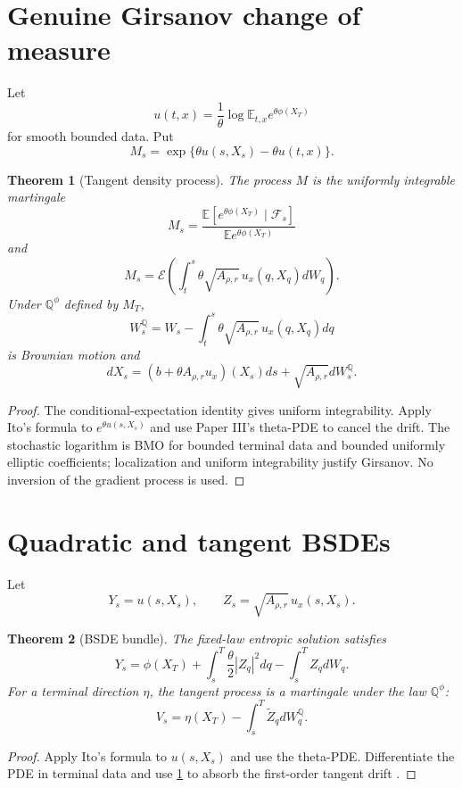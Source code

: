 \documentclass[11pt,reqno]{amsart}
\newtheorem{theorem}{Theorem}[section]
\theoremstyle{definition}
\theoremstyle{remark}
\newcommand{\E}{\mathbb E}
\newcommand{\Qp}{\mathbb Q}
\newcommand{\abs}[1]{\left\lvert #1\right\rvert}
\begin{document}
\section{Genuine Girsanov change of measure}\label{sec:girsanov}
Let
\[
 u(t,x)=\frac1\theta\log\E_{t,x}e^{\theta\phi(X_T)}
\]
for smooth bounded data.  Put
\[
 M_s=\exp\{\theta u(s,X_s)-\theta u(t,x)\}.
\]

\begin{theorem}[Tangent density process]\label{thm:girsanov}
The process $M$ is the uniformly integrable martingale
\[
 M_s=\frac{\E[e^{\theta\phi(X_T)}\mid\mathcal F_s]}
 {\E e^{\theta\phi(X_T)}}
\]
and
\[
 M_s=\mathcal E\left(
 \int_t^s\theta\sqrt{A_{\rho,r}}\,u_x(q,X_q)dW_q
 \right).
\]
Under $\Qp^\phi$ defined by $M_T$,
\[
 W_s^{\Qp}=W_s-
 \int_t^s\theta\sqrt{A_{\rho,r}}\,u_x(q,X_q)dq
\]
is Brownian motion and
\[
 dX_s=
 \left(b+\theta A_{\rho,r}u_x\right)(X_s)ds
 +\sqrt{A_{\rho,r}}dW_s^{\Qp}.
\]
\end{theorem}
\begin{proof}
The conditional-expectation identity gives uniform integrability.  Apply
Ito's formula to $e^{\theta u(s,X_s)}$ and use Paper III's theta-PDE to cancel
the drift.  The stochastic logarithm is BMO for bounded terminal data and
bounded uniformly elliptic coefficients; localization and uniform
integrability justify Girsanov.  No inversion of the gradient process is used.
\end{proof}

\section{Quadratic and tangent BSDEs}\label{sec:bsde}
Let
\[
 Y_s=u(s,X_s),\qquad
 Z_s=\sqrt{A_{\rho,r}}\,u_x(s,X_s).
\]

\begin{theorem}[BSDE bundle]\label{thm:bsde}
The fixed-law entropic solution satisfies
\[
 Y_s=\phi(X_T)+
 \int_s^T\frac\theta2\abs{Z_q}^2dq
 -\int_s^TZ_qdW_q.
\]
For a terminal direction $\eta$, the tangent process is a martingale under the
law $\Qp^\phi$:
\[
 V_s=\eta(X_T)-\int_s^T\widetilde Z_qdW_q^{\Qp}.
\]
\end{theorem}
\begin{proof}
Apply Ito's formula to $u(s,X_s)$ and use the theta-PDE.  Differentiate the PDE
in terminal data and use \cref{thm:girsanov} to absorb the first-order tangent
drift \cite{PardouxPeng1990,Kobylanski2000}.
\end{proof}
\end{document}
